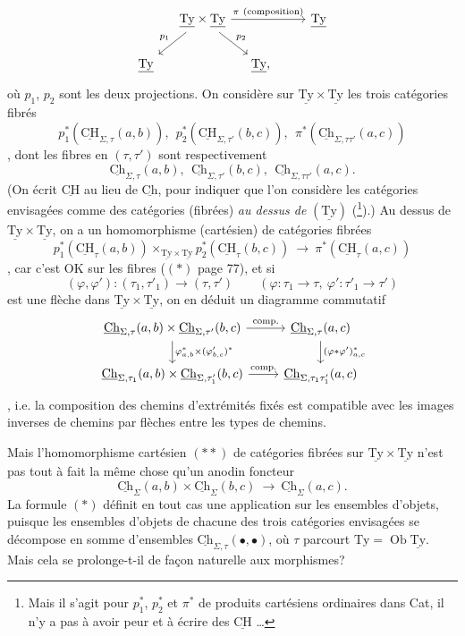 \documentclass[11pt]{article}
\newcommand{\printedpage}[1]{\marginpar{\footnotesize p.~#1}}
\newcommand{\msp}[1]{\marginpar{\vspace*{10pt}\footnotesize [#1]}}
\newcommand{\Ch}{\underline{\mathrm{Ch}}}
\newcommand{\Ty}{\underline{\mathrm{Ty}}}
\newcommand{\CH}{\underline{\mathrm{CH}}}
\begin{document}
\[
\begin{tikzcd}[column sep=small]
 & \Ty\times\Ty \ar[rrr,"\pi\ (\text{composition})"] \ar[dl,"p_1"'] \ar[dr,"p_2"] & & & \Ty \\
\Ty & & \Ty, & &
\end{tikzcd}
\]
où $p_1$, $p_2$ sont les deux projections. On considère sur $\Ty\times\Ty$ les trois catégories fibrés %
\[
p_1^*(\CH_{\Sigma,\tau}(a,b)),\ \ p_2^*(\CH_{\Sigma,\tau'}(b,c)),\ \ \pi^*(\Ch_{\Sigma,\tau\tau'}(a,c))
\]
, dont les fibres en $(\tau,\tau')$ sont respectivement %
\[
\Ch_{\Sigma,\tau}(a,b),\ \ \Ch_{\Sigma,\tau'}(b,c),\ \ \Ch_{\Sigma,\tau\tau'}(a,c).
\]
(On écrit $\CH$ au lieu de $\Ch$, pour indiquer que l'on considère les catégories envisagées comme des catégories (fibrées) \textit{au dessus de} $(\Ty)$ (\footnote{Mais il s'agit pour $p_1^*$, $p_2^*$ et $\pi^*$ de produits cartésiens ordinaires dans Cat, il n'y a pas à avoir peur et à écrire des $\CH$ \ldots}).) Au dessus de $\Ty\times\Ty$, on a un homomorphisme (cartésien) de catégories fibrées
\[
p_1^*(\CH_{\tau}(a,b))\times_{\Ty\times\Ty} p_2^*(\CH_{\tau}(b,c)) \ \longrightarrow\ \pi^*(\CH_{\tau}(a,c)) \tag*{$(**)$}
\]
,
\msp{page 79}
car c'est OK sur les fibres ($(*)$ page 77), et si
\[
(\varphi,\varphi') : (\tau_1,\tau'_1) \longrightarrow (\tau,\tau') \qquad (\varphi : \tau_1 \longrightarrow \tau,\ \varphi' : \tau'_1 \longrightarrow \tau')
\]
est une flèche dans $\Ty\times\Ty$, on en déduit un diagramme commutatif
\[
\begin{tikzcd}
\Ch_{\Sigma,\tau}(a,b)\times\Ch_{\Sigma,\tau'}(b,c) \ar[r,"\text{comp.}"] \ar[d,"\varphi^*_{a,b}\times(\varphi'_{b,c})^*"] & \Ch_{\Sigma,\tau}(a,c) \ar[d,"(\varphi*\varphi')^*_{a,c}"] \\
\Ch_{\Sigma,\tau_1}(a,b)\times\Ch_{\Sigma,\tau'_1}(b,c) \ar[r,"\text{comp.}"] & \Ch_{\Sigma,\tau_1\tau'_1}(a,c)
\end{tikzcd}
\]
\printedpage{52}
, i.e. la composition des chemins d'extrémités fixés est compatible avec les images inverses de chemins par flèches entre les types de chemins.

Mais l'homomorphisme cartésien $(**)$ de catégories fibrées sur $\Ty\times\Ty$ n'est pas tout à fait la même chose qu'un anodin foncteur
\[
\Ch_{\Sigma}(a,b)\times\Ch_{\Sigma}(b,c) \ \longrightarrow\ \Ch_{\Sigma}(a,c). \tag*{$(*)$}
\]
La formule $(*)$ définit en tout cas une application sur les ensembles d'objets, puisque les ensembles d'objets de chacune des trois catégories envisagées se décompose en somme d'ensembles $\Ch_{\Sigma,\tau}(\bullet,\bullet)$, où $\tau$ parcourt $\mathrm{Ty} = \operatorname{Ob}\Ty$. Mais cela se prolonge-t-il de façon naturelle aux morphismes?
\end{document}
